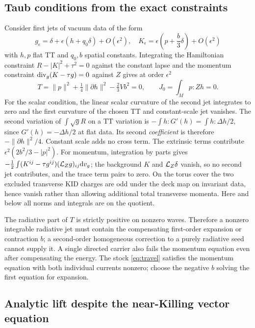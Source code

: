 \subsection{Taub conditions from the exact constraints}

Consider first jets of vacuum data of the form
\[
   g_\epsilon=\delta+\epsilon(h+q_0\delta)+O(\epsilon^2),\quad
   K_\epsilon=\epsilon\left(p+\frac{b}{3}\delta\right)+O(\epsilon^2)
\]
with \(h,p\) flat TT and \(q_0,b\) spatial constants. Integrating the Hamiltonian constraint \(R-|K|^2+\tau^2=0\) against the constant lapse and the momentum constraint \(\operatorname{div}_g(K-\tau g)=0\) against \(Z\) gives at order \(\epsilon^2\)
\begin{equation}\label{eq:taub}
 T=\|p\|^2+\tfrac14\|\partial h\|^2-\tfrac23 Vb^2=0,\qquad
 J_0=\int_M p:Zh=0 .
\end{equation}
For the scalar condition, the linear scalar curvature of the second jet integrates to zero and the first curvature of the chosen TT and constant-scale jet vanishes. The second variation of \(\int\sqrt g R\) on a TT variation is
\(-\int h: G'(h)=\int h:\Delta h/2\), since \(G'(h)=-\Delta h/2\) at flat data. Its second \emph{coefficient} is therefore \(-\|\partial h\|^2/4\). Constant scale adds no cross term. The extrinsic terms contribute \(\epsilon^2(2b^2/3-|p|^2)\). For momentum, integration by parts gives
\(
 -\tfrac12\int (K^{ij}-\tau g^{ij})(\mathcal L_Zg)_{ij}\mathrm d v_g
\);
the background \(K\) and \(\mathcal L_Z\delta\) vanish, so no second jet contributes, and the trace term pairs to zero. On the torus cover the two excluded transverse KID charges are odd under the deck map on invariant data, hence vanish rather than allowing additional total transverse momenta. Here and below all norms and integrals are on the quotient.

The radiative part of \(T\) is strictly positive on nonzero waves. Therefore a nonzero integrable radiative jet must contain the compensating first-order expansion or contraction \(b\); a second-order homogeneous correction to a purely radiative seed cannot supply it. A single directed carrier also fails the momentum equation even after compensating the energy. The stock \eqref{eq:travel} satisfies the momentum equation with both individual currents nonzero; choose the negative \(b\) solving the first equation for expansion.

\subsection{Analytic lift despite the near-Killing vector equation}


